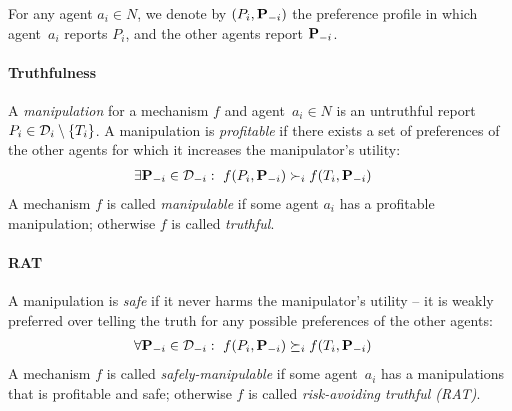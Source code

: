 For any agent $a_i \in N$, we denote by $(P_i, \mathbf{P}_{-i})$ the preference profile in which agent~$a_i$ reports $P_i$, and the other agents report $\mathbf{P}_{-i}$.

\paragraph{Truthfulness}
A \emph{manipulation} for a mechanism $f$ and agent~$a_i \in N$ is an untruthful report $P_i \in \mathcal{D}_i \setminus \{T_i\}$.
A manipulation is \emph{profitable} if there exists a set of preferences of the other agents for which it increases the manipulator's utility:
\begin{align}
\label{eq:manipulation}
    &\exists \mathbf{P}_{-i}
    \in \mathbf{\mathcal{D}}_{-i} 
    :~ f(P_i,\mathbf{P}_{-i}) \succ_i f(T_i,\mathbf{P}_{-i})
\end{align}
A mechanism $f$ is called \emph{manipulable} if some agent $a_i$ has a profitable manipulation; otherwise $f$ is called \emph{truthful}. 



\paragraph{RAT}
A manipulation is \emph{safe} if it never harms the manipulator's utility -- it is weakly preferred over telling the truth for any possible preferences of the other agents:
\begin{align}
\label{eq:safe-manipulation}
    &\forall \mathbf{P}_{-i}
    \in \mathbf{\mathcal{D}}_{-i} 
    :~ f(P_i,\mathbf{P}_{-i}) \succeq_i f(T_i,\mathbf{P}_{-i})
\end{align}
%
%
%
%
%
A mechanism $f$ is called \emph{safely-manipulable} if some agent~$a_i$ has a manipulations that is profitable and safe; otherwise $f$ is called \emph{risk-avoiding truthful (RAT)}. 




